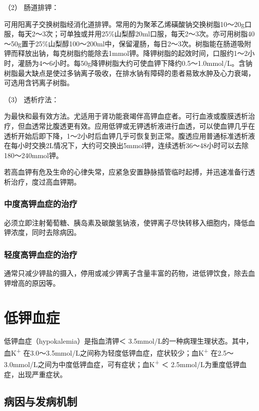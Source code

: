 \hypertarget{text00195.htmlux5cux23CHP6-2-1-3-2-5-2}{}
（2） 肠道排钾：

可用阳离子交换树脂经消化道排钾。常用的为聚苯乙烯磺酸钠交换树脂10～20g口服，每天2～3次；可单独或并用25\%山梨醇20ml口服，每天2～3次。亦可用树脂40～50g置于25\%山梨醇100～200ml中，保留灌肠，每日2～3次。树脂能在肠道吸附钾而释放出钠，每克树脂约能除去1mmol钾。降钾树脂的起效时间，口服约1～2小时，灌肠为4～6小时。每50g降钾树脂大约可使血钾下降约0.5～1.0mmol/L。含钠树脂最大缺点是使过多钠离子吸收，在排水钠有障碍的患者易致水肿及心力衰竭，可选用含钙离子树脂。

\hypertarget{text00195.htmlux5cux23CHP6-2-1-3-2-5-3}{}
（3） 透析疗法：

为最快和最有效方法。尤适用于肾功能衰竭伴高钾血症者。可行血液或腹膜透析治疗，但血透常比腹透更有效。应用低钾或无钾透析液进行血透，可以使血钾几乎在透析开始后即下降，1～2小时后血钾几乎可恢复到正常。腹透应用普通标准透析液在每小时交换2L情况下，大约可交换出5mmol钾，连续透析36～48小时可以去除180～240mmol钾。

若高血钾有危及生命的心律失常，应紧急安置静脉插管临时起搏，并迅速准备行透析治疗，度过高血钾期。

\subsubsection{中度高钾血症的治疗}

必须立即注射葡萄糖、胰岛素及碳酸氢钠液，使钾离子尽快转移入细胞内，降低血钾浓度，同时去除病因。

\subsubsection{轻度高钾血症的治疗}

通常只减少钾盐的摄入，停用或减少钾离子含量丰富的药物，进低钾饮食，除去血钾增高的原因等。

\protect\hypertarget{text00196.html}{}{}

\section{低钾血症}

低钾血症（hypokalemia）是指血清钾＜
3.5mmol/L的一种病理生理状态。其中，血K\textsuperscript{+}
在3.0～3.5mmol/L之间称为轻度低钾血症，症状较少；血K\textsuperscript{+}
在2.5～3.0mmol/L之间为中度低钾血症，可有症状；血K\textsuperscript{+} ＜
2.5mmol/L为重度低钾血症，出现严重症状。

\subsection{病因与发病机制}

